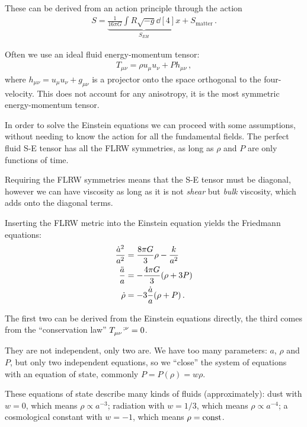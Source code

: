\documentclass[main.tex]{subfiles}
\begin{document}
These can be derived from an action principle through the action 
%
\begin{align}
S = \underbrace{\frac{1}{16 \pi G} \int R \sqrt{-g} \dd[4]{x}}_{S_{EH}} + 
S_{\text{matter}}
\,.
\end{align}

Often we use an ideal fluid energy-momentum tensor: 
%
\begin{align}
T_{\mu \nu } = \rho u_{\mu } u_{\nu } + P h_{\mu \nu }
\,,
\end{align}
%
where \(h_{\mu \nu } = u_{\mu } u_{\nu } + g_{\mu \nu }\) is a projector onto the space orthogonal to the four-velocity. This does not account for any anisotropy, it is the most symmetric energy-momentum tensor. 

In order to solve the Einstein equations we can proceed with some assumptions, without needing to know the action for all the fundamental fields. The perfect fluid S-E tensor has all the FLRW symmetries, as long as \(\rho \) and \(P\) are only functions of time. 


Requiring the FLRW symmetries means that the S-E tensor must be diagonal, however we can have viscosity as long as it is not \emph{shear} but \emph{bulk} viscosity, which adds onto the diagonal terms.

Inserting the FLRW metric into the Einstein equation yields the Friedmann equations: 
%
\begin{align}
\frac{\dot{a}^2}{a^2} &= \frac{8\pi G}{3} \rho - \frac{k}{a^2}  \\
\frac{\ddot{a}}{a} &= - \frac{4 \pi G}{3} \qty(\rho + 3 P)  \\
\dot{\rho} &= - 3 \frac{\dot{a}}{a} \qty(\rho + P)
\,.
\end{align}

The first two can be derived from the Einstein equations directly, the third comes from the ``conservation law'' \(\tensor{T}{_{\mu \nu }^{;\nu }} = 0\). 

They are not independent, only two are.
We have too many parameters: \(a\), \(\rho \) and \(P\), but only two independent equations, so we ``close'' the system of equations with an equation of state, commonly \(P = P(\rho ) = w \rho \). 

These equations of state describe many kinds of fluids (approximately):
dust with \(w = 0\), which means \(\rho \propto a^{-3}\); radiation with \(w = 1/3\), which means \(\rho \propto a^{-4}\); a cosmological constant with \(w = -1\), which means \(\rho = \text{const}\).
\end{document}
